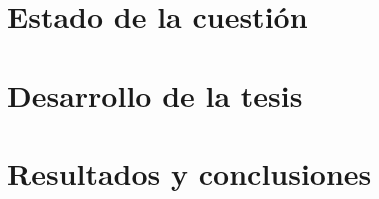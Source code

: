 \documentclass[b5paper,nobib,makeidx,justified,twoside,symmetric]{tufte-book}
\title{\thetitle}
\author[\theauthor]{\theauthor}
\begin{document}

\frontmatter
\maketitle





\cleardoublepage

\tableofcontents
\listoffigures
\listoftables

\mainmatter

\part{Estado de la cuestión}
\afterpage{\nopagecolor}



\part{Desarrollo de la tesis}
\afterpage{\nopagecolor}


\part{Resultados y conclusiones}
\afterpage{\nopagecolor}



\backmatter
\printglossaries



\printindex


\end{document}
